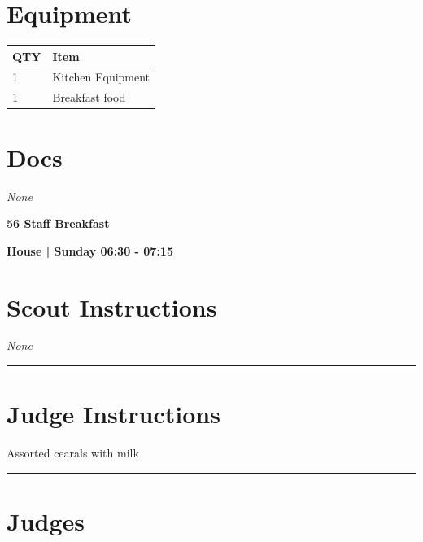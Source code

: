 \documentclass[10pt]{article}
\newcommand{\newtitle}[1]{\begin{center}{\Huge\bfseries #1 }\\ \vspace{5mm}\end{center}}
\newcommand{\newsubtitle}[1]{\begin{center}{\color{grey}\Large\bfseries #1 }\\ \vspace{5mm}\end{center}}
\begin{document}
	\begin{multicols}{2}

		\section*{\faWrench \: Equipment}

		
	\begin{center}
			\begin{tabular}{p{2cm}p{4cm}}


				\textbf{QTY} & \textbf{Item} \\\toprule
												1&Kitchen Equipment\\\midrule
												1&Breakfast food\\\midrule
								\end{tabular}

			\end{center}

		
		\vfill\null
		\columnbreak

			\section*{\faFile \: Docs}
		 	\textit{None}
	

		\vfill\null

		\end{multicols}



	\vspace{1cm}


	\clearpage
		\newtitle{56 Staff Breakfast }
	\newsubtitle{House | Sunday 06:30 - 07:15}
		\setcounter{section}{55}
	\section*{Scout Instructions}
		\textit{None}
	
	\vspace{0.5cm}
	\hrule
	\vspace{0.5cm}

		\section*{Judge Instructions}
		Assorted cearals with milk
\vspace{0.5cm}
	\hrule
	\vspace{0.5cm}
		\section*{\faUsers \: Judges}
\end{document}
